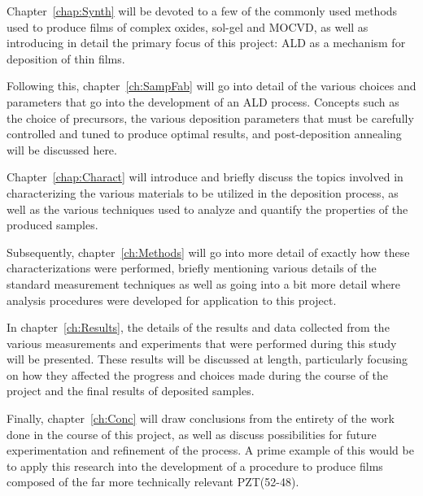 Chapter~\ref{chap:Synth} will be devoted to a few of the commonly used methods used to produce films of complex oxides, sol-gel and MOCVD, as well as introducing in detail the primary focus of this project: ALD as a mechanism for deposition of thin films. 

Following this, chapter~\ref{ch:SampFab} will go into detail of the various choices and parameters that go into the development of an ALD process. Concepts such as the choice of precursors, the various deposition parameters that must be carefully controlled and tuned to produce optimal results, and post-deposition annealing will be discussed here. 

Chapter~\ref{chap:Charact} will introduce and briefly discuss the topics involved in characterizing the various materials to be utilized in the deposition process, as well as the various techniques used to analyze and quantify the properties of the produced samples. 

Subsequently, chapter~\ref{ch:Methods} will go into more detail of exactly how these characterizations were performed, briefly mentioning various details of the standard measurement techniques as well as going into a bit more detail where analysis procedures were developed for application to this project. 

In chapter~\ref{ch:Results}, the details of the results and data collected from the various measurements and experiments that were performed during this study will be presented.  These results will be discussed at length, particularly focusing on how they affected the progress and choices made during the course of the project and the final results of deposited samples. 

Finally, chapter~\ref{ch:Conc} will draw conclusions from the entirety of the work done in the course of this project, as well as discuss possibilities for future experimentation and refinement of the process. A prime example of this would be to apply this research into the development of a procedure to produce films composed of the far more technically relevant PZT(52-48). 


%
